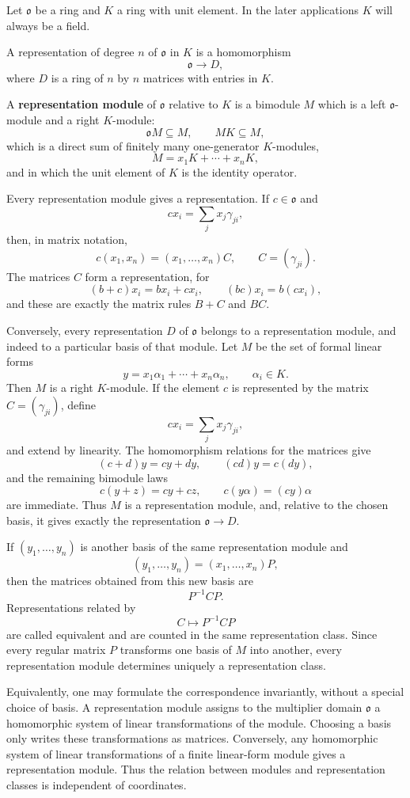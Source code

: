 \documentclass[
  11pt,
]{article}
\begin{document}
Let \(\mathfrak{o}\) be a ring and \(K\) a ring with unit element. In
the later applications \(K\) will always be a field.

A representation of degree \(n\) of \(\mathfrak{o}\) in \(K\) is a
homomorphism \[
  \mathfrak{o}\to D,
\] where \(D\) is a ring of \(n\) by \(n\) matrices with entries in
\(K\).

A \textbf{representation module} of \(\mathfrak{o}\) relative to \(K\)
is a bimodule \(M\) which is a left \(\mathfrak{o}\)-module and a right
\(K\)-module: \[
  \mathfrak{o}M\subseteq M,
  \qquad
  MK\subseteq M,
\] which is a direct sum of finitely many one-generator \(K\)-modules,
\[
  M=x_1K+\cdots+x_nK,
\] and in which the unit element of \(K\) is the identity operator.

Every representation module gives a representation. If
\(c\in\mathfrak{o}\) and \[
  cx_i=\sum_j x_j\gamma_{ji},
\] then, in matrix notation, \[
  c(x_1,
x_n)=(x_1,\ldots,x_n)C,
  \qquad C=(\gamma_{ji}).
\] The matrices \(C\) form a representation, for \[
  (b+c)x_i=bx_i+cx_i,
  \qquad
  (bc)x_i=b(cx_i),
\] and these are exactly the matrix rules \(B+C\) and \(BC\).

Conversely, every representation \(D\) of \(\mathfrak{o}\) belongs to a
representation module, and indeed to a particular basis of that module.
Let \(M\) be the set of formal linear forms \[
  y=x_1\alpha_1+\cdots+x_n\alpha_n,
  \qquad \alpha_i\in K.
\] Then \(M\) is a right \(K\)-module. If the element \(c\) is
represented by the matrix \(C=(\gamma_{ji})\), define \[
  cx_i=\sum_j x_j\gamma_{ji},
\] and extend by linearity. The homomorphism relations for the matrices
give \[
  (c+d)y=cy+dy,
  \qquad
  (cd)y=c(dy),
\] and the remaining bimodule laws \[
  c(y+z)=cy+cz,
  \qquad
  c(y\alpha)=(cy)\alpha
\] are immediate. Thus \(M\) is a representation module, and, relative
to the chosen basis, it gives exactly the representation
\(\mathfrak{o}\to D\).

If \((y_1,\ldots,y_n)\) is another basis of the same representation
module and \[
  (y_1,\ldots,y_n)=(x_1,\ldots,x_n)P,
\] then the matrices obtained from this new basis are \[
  P^{-1}CP.
\] Representations related by \[
  C\mapsto P^{-1}CP
\] are called equivalent and are counted in the same representation
class. Since every regular matrix \(P\) transforms one basis of \(M\)
into another, every representation module determines uniquely a
representation class.

Equivalently, one may formulate the correspondence invariantly, without
a special choice of basis. A representation module assigns to the
multiplier domain \(\mathfrak{o}\) a homomorphic system of linear
transformations of the module. Choosing a basis only writes these
transformations as matrices. Conversely, any homomorphic system of
linear transformations of a finite linear-form module gives a
representation module. Thus the relation between modules and
representation classes is independent of coordinates.
\end{document}
